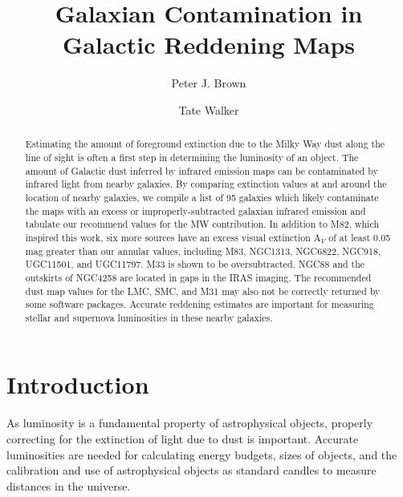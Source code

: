 \documentclass[twocolumn]{aastex63}
\begin{document}
\title{Galaxian Contamination in Galactic Reddening Maps}



\author[0000-0001-6272-5507]{Peter J. Brown}

\author{Tate Walker}


\begin{abstract}

Estimating the amount of foreground extinction due to the Milky Way dust along the line of sight is often a first step in determining the luminosity of an object.  The amount of Galactic dust inferred by infrared emission maps can be contaminated by infrared light from nearby galaxies.  By comparing extinction values at and around the location of nearby galaxies, we compile a list of 95 galaxies which likely contaminate the maps with an excess or improperly-subtracted galaxian infrared emission and tabulate our recommend values for the MW contribution.  In addition to M82, which inspired this work, six more sources have an excess visual extinction A$_V$ of at least 0.05 mag greater than our annular values, including M83, NGC1313, NGC6822, NGC918, UGC11501, and  UGC11797. M33 is shown to be oversubtracted. NGC88 and the outskirts of NGC4258 are located in gaps in the IRAS imaging.  The recommended dust map values for the LMC, SMC, and M31 may also not be correctly returned by some software packages. Accurate reddening estimates are important for measuring stellar and supernova luminosities in these nearby galaxies.

\end{abstract}



\section{Introduction} \label{sec:intro}

As luminosity is a fundamental property of astrophysical objects, properly correcting for the extinction of light due to dust is important.  Accurate luminosities are needed for calculating energy budgets, sizes of objects, and the calibration and use of astrophysical objects as standard candles to measure distances in the universe.
\end{document}
